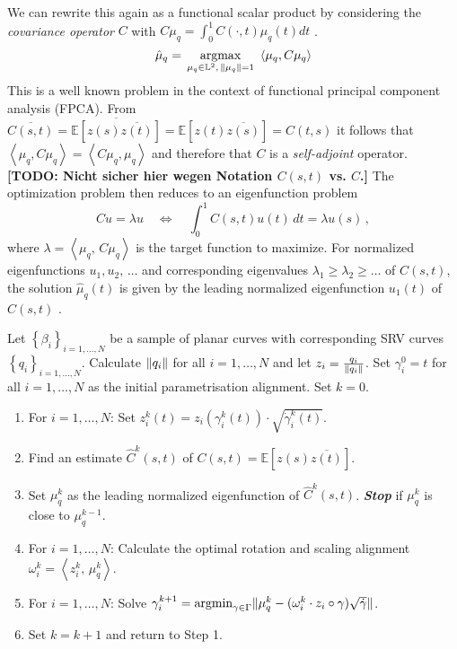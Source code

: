 We can rewrite this again as a functional scalar product by considering the \emph{covariance operator} $C$ with $C\mu_q = \int_0^1 C(\cdot,t) \mu_q(t) dt$ \parencite[see][153]{RamsaySilverman2005}.
$$ \hat\mu_q = \, \operatorname*{argmax}_{\mu_q \in \mathbb{L}^2,\,\lVert\mu_q\rVert = 1}\,\,
    \left\langle \mu_q, C\mu_q \right\rangle $$
This is a well known problem in the context of functional principal component analysis (FPCA).
From $\overline{C(s,t)} = \overline{\mathbb{E}[z(s)\overline{z(t)}]} = \mathbb{E}[z(t)\overline{z(s)}] = C(t,s)$ it follows that $\left\langle \mu_q, C \mu_q \right\rangle = \left\langle C \mu_q, \mu_q \right\rangle$ and therefore that $C$ is a \emph{self-adjoint} operator.
\textbf{[TODO: Nicht sicher hier wegen Notation $C(s,t)$ vs. $C$.]}
The optimization problem then reduces to an eigenfunction problem 
$$ Cu = \lambda u \quad \Leftrightarrow \quad \int_0^1 C(s, t) u(t)\, dt = \lambda u(s)\,,$$
where $\lambda = \left\langle \mu_q,\, C \mu_q \right\rangle$ is the target function to maximize.
For normalized eigenfunctions $u_1, u_2,\,\dots$ and corresponding eigenvalues $\lambda_1 \geq \lambda_2 \geq \dots$ of $C(s,t)$, the solution $\hat\mu_q(t)$ is given by the leading normalized eigenfunction $u_1(t)$ of $C(s,t)$ \parencite[see][153,397]{RamsaySilverman2005}.

\begin{algorithm}
  \label{algo:mean}
  Let $\left\{\beta_i\right\}_{i=1,\dots,N}$ be a sample of planar curves with corresponding SRV curves $\left\{ q_i \right\}_{i=1,\dots,N}$.
  Calculate $\lVert q_i\rVert$ for all $i=1,\dots,N$ and let $z_i = \frac{q_i}{\lVert q_i\rVert}$.
  Set $\gamma_i^0 = t$ for all $i=1,\dots,N$ as the initial parametrisation alignment.
  Set $k = 0$. 
  \begin{enumerate}
    \item For $i=1,\dots,N$: Set $z_i^k(t) = z_i\left(\gamma^k_i(t)\right) \cdot \sqrt{\dot\gamma_i^k(t)}$.
    \item Find an estimate $\hat{C}^k(s,t)$ of $C(s,t) = \mathbb{E}[z(s)\overline{z(t)}]$.
    \item Set $\mu_q^k$ as the leading normalized eigenfunction of $\hat{C}^k(s,t)$. \emph{\textbf{Stop}} if $\mu_q^k$ is close to $\mu_q^{k-1}$.
    \item For $i=1,\dots,N$: Calculate the optimal rotation and scaling alignment $\omega^k_i = \left\langle z_i^k,\, \mu_q^k \right\rangle$.
    \item For $i=1,\dots,N$: Solve $\gamma_i^{k+1} = \operatorname*{argmin}_{\gamma \in \Gamma} \lVert\mu_q^k - (\omega_i^k \cdot z_i \circ \gamma ) \sqrt{\dot\gamma}\rVert$.
    \item Set $k = k+1$ and return to Step 1.
  \end{enumerate}
\end{algorithm}

